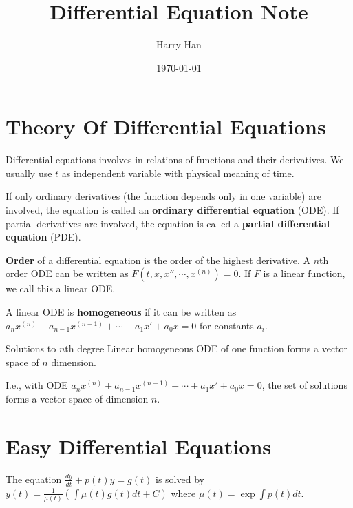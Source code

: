 \documentclass[12pt]{article}
\title{Differential Equation Note}
\author{Harry Han}
\date{\today}
\begin{document}
\section{Theory Of Differential Equations}

\begin{definition} 
	Differential equations involves in relations of functions and their derivatives.
	We usually use $t$ as independent variable with physical meaning of time.

	If only ordinary derivatives (the function depends only in one variable) are involved, the equation is called an \textbf{ordinary differential equation} (ODE).
	If partial derivatives are involved, the equation is called a \textbf{partial differential equation} (PDE).

	\textbf{Order} of a differential equation is the order of the highest derivative.
	A $n$th order ODE can be written as $F(t, x, x'', \cdots, x^{(n)}) = 0$. If $F$ is a linear function, we call this a linear ODE.

	A linear ODE is \textbf{homogeneous} if it can be written as $a_{n}x^{(n)} + a_{n-1}x^{(n-1)} + \cdots + a_{1}x' + a_{0}x = 0$ for constants $a_i$.
\end{definition}

\begin{definition}
\end{definition}

\begin{theorem}
	Solutions to $n$th degree Linear homogeneous ODE of one function forms a vector space of $n$ dimension.

	I.e., with ODE $a_{n}x^{(n)} + a_{n-1}x^{(n-1)} + \cdots + a_{1}x' + a_{0}x = 0$, the set of solutions forms a vector space of dimension $n$.
\end{theorem}

\begin{theorem}

\end{theorem}

\section{Easy Differential Equations}

\begin{theorem}
	The equation $\frac{dy}{dt} + p(t)y = g(t)$ is solved by $y(t) = \frac{1}{\mu(t)} (\int \mu(t)g(t)dt+C)$ where $\mu(t) = \exp{\int p(t)dt}$.

\end{theorem}
\end{document}
